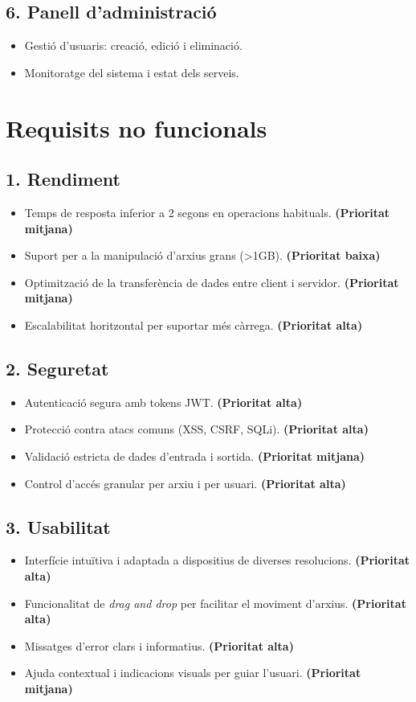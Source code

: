 \subsection{6. Panell d'administració}
\begin{itemize}
  \item Gestió d'usuaris: creació, edició i eliminació.
  \item Monitoratge del sistema i estat dels serveis.
\end{itemize}

\section{Requisits no funcionals}

\subsection{1. Rendiment}
\begin{itemize}
  \item Temps de resposta inferior a 2 segons en operacions habituals. \textbf{(Prioritat mitjana)}
  \item Suport per a la manipulació d'arxius grans (>1GB). \textbf{(Prioritat baixa)}
  \item Optimització de la transferència de dades entre client i servidor. \textbf{(Prioritat mitjana)}
  \item Escalabilitat horitzontal per suportar més càrrega. \textbf{(Prioritat alta)}
\end{itemize}

\subsection{2. Seguretat}
\begin{itemize}
  \item Autenticació segura amb tokens JWT. \textbf{(Prioritat alta)}
  \item Protecció contra atacs comuns (XSS, CSRF, SQLi). \textbf{(Prioritat alta)}
  \item Validació estricta de dades d'entrada i sortida. \textbf{(Prioritat mitjana)}
  \item Control d'accés granular per arxiu i per usuari. \textbf{(Prioritat alta)}
\end{itemize}

\subsection{3. Usabilitat}
\begin{itemize}
  \item Interfície intuïtiva i adaptada a dispositius de diverses resolucions. \textbf{(Prioritat alta)}
  \item Funcionalitat de \textit{drag and drop} per facilitar el moviment d'arxius. \textbf{(Prioritat alta)}
  \item Missatges d'error clars i informatius. \textbf{(Prioritat alta)}
  \item Ajuda contextual i indicacions visuals per guiar l'usuari. \textbf{(Prioritat mitjana)}
\end{itemize}


